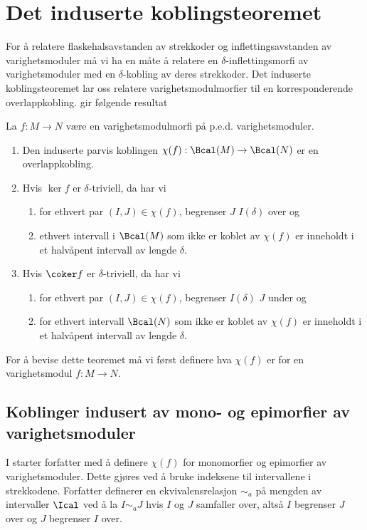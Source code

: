 \section{Det induserte koblingsteoremet}
For å relatere flaskehalsavstanden av strekkoder og
inflettingsavstanden av varighetsmoduler må vi ha en måte
å relatere en $\delta$-inflettingsmorfi av
varighetsmoduler med en $\delta$-kobling av deres
strekkoder. Det induserte koblingsteoremet lar oss
relatere varighetsmodulmorfier til en korresponderende
overlappkobling. \citep[Teorem 3.1]{Bauer2020} gir
følgende resultat

\begin{teorem}\label{trm:IKT}
  La $f: M\to N$ være en varighetsmodulmorfi på p.e.d.
  varighetsmoduler.
  \begin{enumerate}
    \item Den induserte parvis koblingen
      $\chi(f):\Bcal(M)\to\Bcal(N)$ er en overlappkobling.
    \item Hvis $\ker f$ er $\delta$-triviell, da har vi
      \begin{enumerate}
        \item for ethvert par $(I,J)\in\chi(f)$, begrenser $J$
          $I(\delta)$ over og
        \item ethvert intervall i $\Bcal(M)$ som ikke er
          koblet av $\chi(f)$ er inneholdt i et halvåpent
          intervall av lengde $\delta$.
      \end{enumerate}

    \item Hvis $\coker f$ er $\delta$-triviell, da har vi
      \begin{enumerate}
        \item for ethvert par $(I,J)\in\chi(f)$, begrenser
          $I(\delta)$ $J$ under og
        \item for ethvert intervall $\Bcal(N)$ som ikke er
          koblet av $\chi(f)$ er inneholdt i et halvåpent
          intervall av lengde $\delta$.
      \end{enumerate}


  \end{enumerate}
\end{teorem}

For å bevise dette teoremet må vi først definere hva
$\chi(f)$ er for en varighetsmodul $f: M\to N$.

\subsection{Koblinger indusert av mono- og epimorfier av
varighetsmoduler}
I \citep[seksjon 3.2]{Bauer2020} starter forfatter med
å definere $\chi(f)$ for monomorfier og epimorfier av
varighetsmoduler. Dette gjøres ved å bruke indeksene til
intervallene i strekkodene. Forfatter definerer en
ekvivalensrelasjon $\sim_a$ på mengden av intervaller
$\Ical$ ved å la $I\sim_a J$ hvis $I$ og $J$ samfaller
over, altså $I$ begrenser $J$ over og $J$ begrenser $I$
over.

